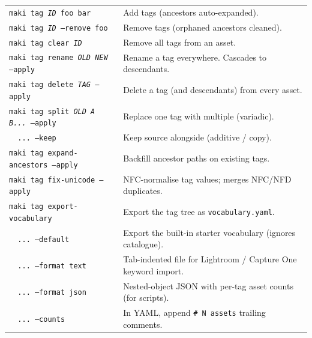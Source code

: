 \documentclass[a3paper,landscape,10pt]{article}
\newcommand{\cmd}[1]{\texttt{\small #1}}
\begin{document}
\renewcommand{\arraystretch}{1.15}
\noindent
\begin{minipage}[t]{0.50\textwidth}
  \small
  \begin{tabularx}{\textwidth}{@{}l >{\RaggedRight\arraybackslash}X@{}}
    \cmd{maki tag \textit{ID} foo bar}            & Add tags (ancestors auto-expanded). \\
    \cmd{maki tag \textit{ID} --remove foo}       & Remove tags (orphaned ancestors cleaned). \\
    \cmd{maki tag clear \textit{ID}}              & Remove all tags from an asset. \\
    \cmd{maki tag rename \textit{OLD} \textit{NEW} --apply} & Rename a tag everywhere. Cascades to descendants. \\
    \cmd{maki tag delete \textit{TAG} --apply}    & Delete a tag (and descendants) from every asset. \\
    \cmd{maki tag split \textit{OLD} \textit{A B...} --apply} & Replace one tag with multiple (variadic). \\
    \cmd{~~...\ --keep}                           & Keep source alongside (additive / copy). \\
    \cmd{maki tag expand-ancestors --apply}       & Backfill ancestor paths on existing tags. \\
    \cmd{maki tag fix-unicode --apply}            & NFC-normalise tag values; merges NFC/NFD duplicates. \\
    \cmd{maki tag export-vocabulary}              & Export the tag tree as \cmd{vocabulary.yaml}. \\
    \cmd{~~...\ --default}                        & Export the built-in starter vocabulary (ignores catalogue). \\
    \cmd{~~...\ --format text}                    & Tab-indented file for Lightroom / Capture One keyword import. \\
    \cmd{~~...\ --format json}                    & Nested-object JSON with per-tag asset counts (for scripts). \\
    \cmd{~~...\ --counts}                         & In YAML, append \cmd{\# N assets} trailing comments. \\
  \end{tabularx}
\end{minipage}\hfill
\end{document}
